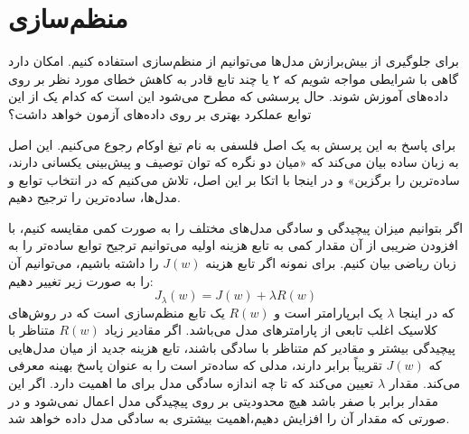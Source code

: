 \section{منظم‌سازی}

برای جلوگیری از بیش‌برازش مدل‌ها می‌توانیم از منظم‌سازی استفاده کنیم. امکان‌ دارد گاهی با شرایطی مواجه شویم که ۲ یا چند تابع قادر به کاهش خطای مورد نظر بر روی داده‌های آموزش شوند. حال پرسشی که مطرح می‌شود این است که کدام یک از این توابع عملکرد بهتری بر روی داده‌های آزمون خواهد داشت؟

برای پاسخ به این پرسش به یک اصل فلسفی به نام تیغ اوکام رجوع می‌کنیم. این اصل به زبان ساده بیان می‌کند که «میان دو نگره‌ که توان توصیف و پیش‌بینی یکسانی دارند، ساده‌ترین را برگزین» و در اینجا با اتکا بر این اصل، تلاش می‌کنیم که در انتخاب توابع و مدل‌ها، ساده‌ترین را ترجیح دهیم.


اگر بتوانیم میزان پیچیدگی و سادگی مدل‌های مختلف را به صورت کمی مقایسه کنیم، با افزودن ضریبی از آن مقدار کمی به تابع هزینه اولیه می‌توانیم ترجیح توابع ساده‌تر را به زبان ریاضی بیان کنیم. برای نمونه اگر تابع هزینه $J(w)$ را داشته باشیم، می‌توانیم آن را به صورت زیر تغییر دهیم:
$$J_\lambda(w) = J(w) + \lambda R(w)$$
که در اینجا $\lambda$ یک ابرپارامتر است و $R(w)$ یک تابع منظم‌سازی است که در روش‌های کلاسیک اغلب تابعی از پارامتر‌های مدل می‌باشد. اگر مقادیر زیاد $R(w)$ متناظر با پیچیدگی بیشتر و مقادیر کم متناظر با سادگی باشند، تابع هزینه جدید از میان مدل‌هایی که $J(w)$ تقریباً برابر دارند، مدلی که ساده‌تر است را به عنوان پاسخ بهینه معرفی می‌کند. مقدار $\lambda$ تعیین می‌کند که تا چه اندازه سادگی مدل برای ما اهمیت دارد. اگر این مقدار برابر با صفر باشد هیچ محدودیتی بر روی پیچیدگی مدل اعمال نمی‌شود و در صورتی که مقدار آن را افزایش دهیم،‌اهمیت بیشتری به سادگی مدل داده خواهد شد.

